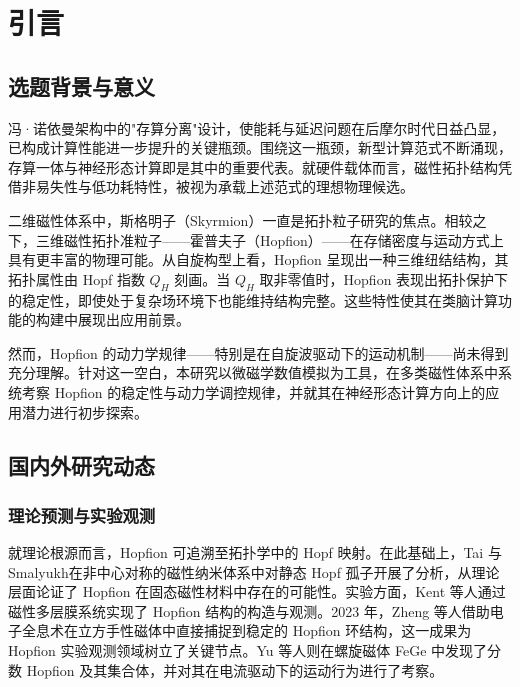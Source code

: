 \chapter{引言}

\section{选题背景与意义}

冯·诺依曼架构中的"存算分离"设计，使能耗与延迟问题在后摩尔时代日益凸显，已构成计算性能进一步提升的关键瓶颈。围绕这一瓶颈，新型计算范式不断涌现，存算一体与神经形态计算即是其中的重要代表。就硬件载体而言，磁性拓扑结构凭借非易失性与低功耗特性，被视为承载上述范式的理想物理候选。

二维磁性体系中，斯格明子（Skyrmion）一直是拓扑粒子研究的焦点。相较之下，三维磁性拓扑准粒子——霍普夫子（Hopfion）——在存储密度与运动方式上具有更丰富的物理可能\cite{gobel2021beyond}。从自旋构型上看，Hopfion 呈现出一种三维纽结结构，其拓扑属性由 Hopf 指数 $Q_H$ 刻画。当 $Q_H$ 取非零值时，Hopfion 表现出拓扑保护下的稳定性，即使处于复杂场环境下也能维持结构完整。这些特性使其在类脑计算功能的构建中展现出应用前景\cite{guslienko2024review}。

然而，Hopfion 的动力学规律——特别是在自旋波驱动下的运动机制——尚未得到充分理解。针对这一空白，本研究以微磁学数值模拟为工具，在多类磁性体系中系统考察 Hopfion 的稳定性与动力学调控规律，并就其在神经形态计算方向上的应用潜力进行初步探索。


\section{国内外研究动态}

\subsection{理论预测与实验观测}

就理论根源而言，Hopfion 可追溯至拓扑学中的 Hopf 映射。在此基础上，Tai 与 Smalyukh\cite{tai2018static}在非中心对称的磁性纳米体系中对静态 Hopf 孤子开展了分析，从理论层面论证了 Hopfion 在固态磁性材料中存在的可能性。实验方面，Kent 等人\cite{kent2021creation}通过磁性多层膜系统实现了 Hopfion 结构的构造与观测。2023 年，Zheng 等人\cite{zheng2023hopfion}借助电子全息术在立方手性磁体中直接捕捉到稳定的 Hopfion 环结构，这一成果为 Hopfion 实验观测领域树立了关键节点。Yu 等人\cite{yu2023realization}则在螺旋磁体 FeGe 中发现了分数 Hopfion 及其集合体，并对其在电流驱动下的运动行为进行了考察。

